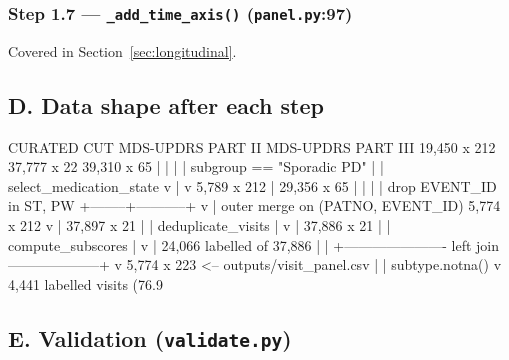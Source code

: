 \documentclass[11pt,a4paper]{article}
\newcommand{\code}[1]{\texttt{\small #1}}
\begin{document}
\subsubsection*{Step 1.7 --- \code{\_add\_time\_axis()} \quad (\code{panel.py}:97)}

Covered in Section~\ref{sec:longitudinal}.

\subsection{D. Data shape after each step}

\begin{codeblock}
CURATED CUT                                  MDS-UPDRS PART II    MDS-UPDRS PART III
19,450 x 212                                 37,777 x 22          39,310 x 65
     |                                            |                    |
     | subgroup == "Sporadic PD"                  |                    | select_medication_state
     v                                            |                    v
5,789 x 212                                       |               29,356 x 65
     |                                            |                    |
     | drop EVENT_ID in {ST, PW}                  +--------+-----------+
     v                                                     | outer merge on (PATNO, EVENT_ID)
5,774 x 212                                                v
     |                                              37,897 x 21
     |                                                     | deduplicate_visits
     |                                                     v
     |                                              37,886 x 21
     |                                                     | compute_subscores
     |                                                     v
     |                                              24,066 labelled of 37,886
     |                                                     |
     +---------------------- left join --------------------+
                             v
                    5,774 x 223   <-- outputs/visit_panel.csv
                             |
                             | subtype.notna()
                             v
                    4,441 labelled visits  (76.9%
\end{codeblock}

\subsection{E. Validation \quad (\code{validate.py})}
\label{sec:validation}
\end{document}
